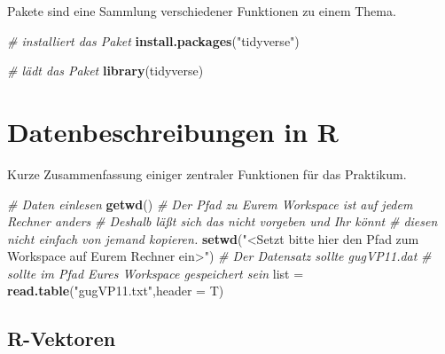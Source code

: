 \documentclass[]{book}
\newenvironment{Shaded}{\begin{snugshade}}{\end{snugshade}}
\newcommand{\KeywordTok}[1]{\textcolor[rgb]{0.13,0.29,0.53}{\textbf{#1}}}
\newcommand{\DataTypeTok}[1]{\textcolor[rgb]{0.13,0.29,0.53}{#1}}
\newcommand{\StringTok}[1]{\textcolor[rgb]{0.31,0.60,0.02}{#1}}
\newcommand{\CommentTok}[1]{\textcolor[rgb]{0.56,0.35,0.01}{\textit{#1}}}
\newcommand{\OperatorTok}[1]{\textcolor[rgb]{0.81,0.36,0.00}{\textbf{#1}}}
\newcommand{\NormalTok}[1]{#1}
\begin{document}
Pakete sind eine Sammlung verschiedener Funktionen zu einem Thema.

\begin{Shaded}
\begin{Highlighting}[]
\CommentTok{# installiert das Paket}
\KeywordTok{install.packages}\NormalTok{(}\StringTok{"tidyverse"}\NormalTok{)}

\CommentTok{# lädt das Paket}
\KeywordTok{library}\NormalTok{(tidyverse)}
\end{Highlighting}
\end{Shaded}

\chapter{Datenbeschreibungen in R}\label{datenbeschreibungen-in-r}

Kurze Zusammenfassung einiger zentraler Funktionen für das Praktikum.

\begin{Shaded}
\begin{Highlighting}[]
\CommentTok{# Daten einlesen}
\KeywordTok{getwd}\NormalTok{()}
\CommentTok{# Der Pfad zu Eurem Workspace ist auf jedem Rechner anders}
\CommentTok{# Deshalb läßt sich das nicht vorgeben und Ihr könnt}
\CommentTok{# diesen nicht einfach von jemand kopieren.}
\KeywordTok{setwd}\NormalTok{(}\StringTok{"<Setzt bitte hier den Pfad zum Workspace auf Eurem Rechner ein>"}\NormalTok{)}
\CommentTok{# Der Datensatz sollte gugVP11.dat }
\CommentTok{# sollte im Pfad Eures Workspace gespeichert sein}
\NormalTok{list =}\StringTok{ }\KeywordTok{read.table}\NormalTok{(}\StringTok{"gugVP11.txt"}\NormalTok{,}\DataTypeTok{header =}\NormalTok{ T)}
\end{Highlighting}
\end{Shaded}

\begin{Shaded}
\end{Shaded}

\section{R-Vektoren}\label{r-vektoren}
\end{document}
